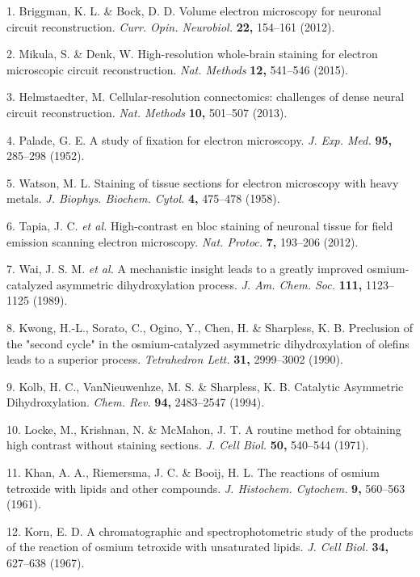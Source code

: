 \documentclass{article}
\newenvironment{reflist}{\par\small\setlength{\parindent}{0pt}\everypar{\hangindent=1.6em\hangafter=1}}{\par}
\begin{document}
\begin{reflist}
1. Briggman, K. L. \& Bock, D. D. Volume electron microscopy for neuronal circuit reconstruction. \emph{Curr. Opin. Neurobiol.} \textbf{22,} 154–161 (2012).

2. Mikula, S. \& Denk, W. High-resolution whole-brain staining for electron microscopic circuit reconstruction. \emph{Nat. Methods} \textbf{12,} 541–546 (2015).

3. Helmstaedter, M. Cellular-resolution connectomics: challenges of dense neural circuit reconstruction. \emph{Nat. Methods} \textbf{10,} 501–507 (2013).

4. Palade, G. E. A study of fixation for electron microscopy. \emph{J. Exp. Med.} \textbf{95,} 285–298 (1952).

5. Watson, M. L. Staining of tissue sections for electron microscopy with heavy metals. \emph{J. Biophys. Biochem. Cytol.} \textbf{4,} 475–478 (1958).

6. Tapia, J. C. \emph{et al.} High-contrast en bloc staining of neuronal tissue for field emission scanning electron microscopy. \emph{Nat. Protoc.} \textbf{7,} 193–206 (2012).

7. Wai, J. S. M. \emph{et al.} A mechanistic insight leads to a greatly improved osmium-catalyzed asymmetric dihydroxylation process. \emph{J. Am. Chem. Soc.} \textbf{111,} 1123–1125 (1989).

8. Kwong, H.-L., Sorato, C., Ogino, Y., Chen, H. \& Sharpless, K. B. Preclusion of the "second cycle" in the osmium-catalyzed asymmetric dihydroxylation of olefins leads to a superior process. \emph{Tetrahedron Lett.} \textbf{31,} 2999–3002 (1990).

9. Kolb, H. C., VanNieuwenhze, M. S. \& Sharpless, K. B. Catalytic Asymmetric Dihydroxylation. \emph{Chem. Rev.} \textbf{94,} 2483–2547 (1994).

10. Locke, M., Krishnan, N. \& McMahon, J. T. A routine method for obtaining high contrast without staining sections. \emph{J. Cell Biol.} \textbf{50,} 540–544 (1971).

11. Khan, A. A., Riemersma, J. C. \& Booij, H. L. The reactions of osmium tetroxide with lipids and other compounds. \emph{J. Histochem. Cytochem.} \textbf{9,} 560–563 (1961).

12. Korn, E. D. A chromatographic and spectrophotometric study of the products of the reaction of osmium tetroxide with unsaturated lipids. \emph{J. Cell Biol.} \textbf{34,} 627–638 (1967).


\end{reflist}
\end{document}
